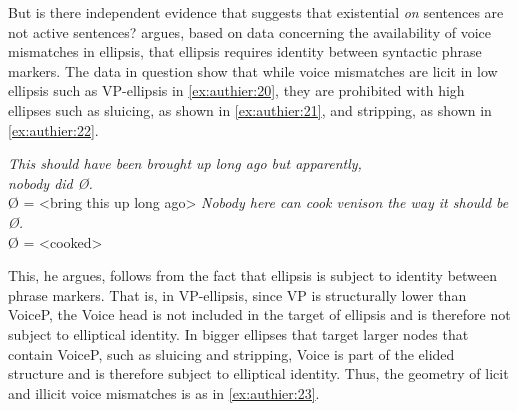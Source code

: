 \documentclass[output=paper,colorlinks,citecolor=brown]{langscibook}
\begin{document}
But is there independent evidence that suggests that existential \textit{on} sentences are not active sentences? \citep{merchant2013a} argues, based on data concerning the availability of voice mismatches in ellipsis, that ellipsis requires identity between syntactic phrase markers. The data in question show that while voice mismatches are licit in low ellipsis such as VP-ellipsis in \ref{ex:authier:20}, they are prohibited with high ellipses such as sluicing, as shown in \ref{ex:authier:21}, and stripping, as shown in \ref{ex:authier:22}.


\begin{exe}
\ex\label{ex:authier:20} 
\begin{xlist} %
        \ex\label{ex:authier:20a}  \textit{This should have been brought up long ago
                but apparently,\\ nobody did Ø.}\\
                Ø = <bring this up long ago>
        \ex\label{ex:authier:20b}   \textit{Nobody here can cook venison the way it should be Ø.}\\
                Ø = <cooked>
\end{xlist}
\end{exe}

\begin{exe}
\ex\label{ex:authier:21} 
\begin{xlist} %
\end{xlist}
\end{exe}

\begin{exe}
\ex\label{ex:authier:22} 
\begin{xlist} %
\end{xlist}
\end{exe}

This, he argues, follows from the fact that ellipsis is subject to identity between phrase markers. That is, in VP-ellipsis, since VP is structurally lower than VoiceP, the Voice head is not included in the target of ellipsis and is therefore not subject to elliptical identity. In bigger ellipses that target larger nodes that contain VoiceP, such as sluicing and stripping, Voice is part of the elided structure and is therefore subject to elliptical identity. Thus, the geometry of licit and illicit voice mismatches is as in \ref{ex:authier:23}.
\end{document}
